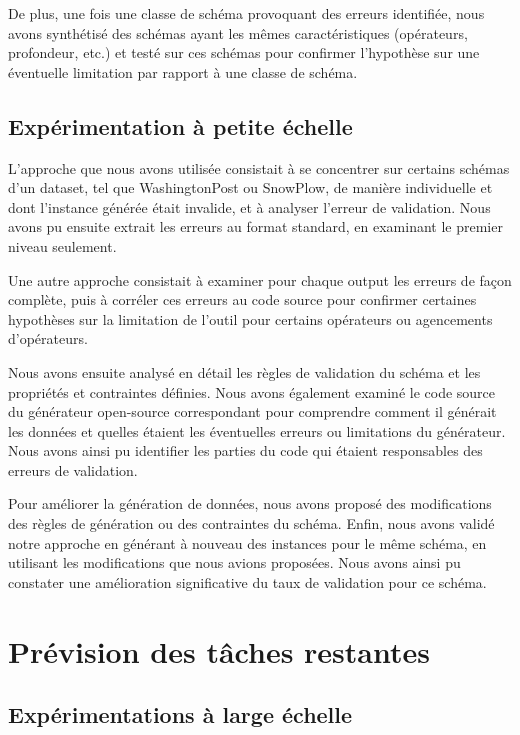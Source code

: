 \documentclass{article}
\begin{document}
De plus, une fois une classe de schéma provoquant des erreurs identifiée, nous avons synthétisé des schémas ayant les mêmes caractéristiques (opérateurs, profondeur, etc.) et testé sur ces schémas pour confirmer l'hypothèse sur une éventuelle limitation par rapport à une classe de schéma.
    \subsection{Expérimentation à petite échelle}

L'approche que nous avons utilisée consistait à se concentrer sur certains schémas d'un dataset, tel que WashingtonPost ou SnowPlow, de manière individuelle et dont l'instance générée était invalide, et à analyser l'erreur de validation. Nous avons pu ensuite extrait les erreurs au format standard, en examinant le premier niveau seulement.

Une autre approche consistait à examiner pour chaque output les erreurs de façon complète, puis à corréler ces erreurs au code source pour confirmer certaines hypothèses sur la limitation de l'outil pour certains opérateurs ou agencements d'opérateurs.

Nous avons ensuite analysé en détail les règles de validation du schéma et les propriétés et contraintes définies. Nous avons également examiné le code source du générateur open-source correspondant pour comprendre comment il générait les données et quelles étaient les éventuelles erreurs ou limitations du générateur. Nous avons ainsi pu identifier les parties du code qui étaient responsables des erreurs de validation.

Pour améliorer la génération de données, nous avons proposé des modifications des règles de génération ou des contraintes du schéma. Enfin, nous avons validé notre approche en générant à nouveau des instances pour le même schéma, en utilisant les modifications que nous avions proposées. Nous avons ainsi pu constater une amélioration significative du taux de validation pour ce schéma.

    

\section{Prévision des tâches restantes}
    \subsection{Expérimentations à large échelle}
\end{document}
